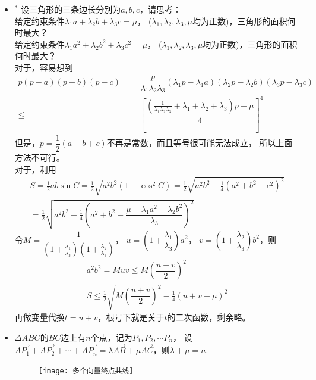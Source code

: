 \begin{itemize}[leftmargin=\inteval{\myitemleftmargin}pt,itemsep=
   \inteval{\myitemitempsep}pt,topsep=\inteval{\myitemtopsep}pt]
\item $^*$ 设三角形的三条边长分别为$ a,b,c $，请思考：\\
 给定约束条件$ \lambda_1 a+\lambda_2 b+\lambda_3 c=\mu $，
($ \lambda_1,\lambda_2,\lambda_3,\mu $均为正数)，三角形的面积何时最大？\\
 给定约束条件$ \lambda_1 a^2+\lambda_2 b^2+\lambda_3 c^2=\mu $，
($ \lambda_1,\lambda_2,\lambda_3,\mu $均为正数)，三角形的面积何时最大？\\
对于，容易想到
\begin{align*}
    p(p-a)(p-b)(p-c)=&\ \dfrac{p}{\lambda_1 \lambda_2 \lambda_3}
    (\lambda_1 p-\lambda_1 a)(\lambda_2 p-\lambda_2 b)
    (\lambda_3 p-\lambda_3 c)\\ \leq&\ 
    \left[\dfrac{\left(\frac{1}{\lambda_1
            \lambda_2 \lambda_3}+\lambda_1+\lambda_2+
        \lambda_3\right)p-\mu}{4}\right]^4
\end{align*}
但是，$ p=\dfrac{1}{2}(a+b+c) $不再是常数，而且等号很可能无法成立，
所以上面方法不可行。\\
对于，利用
\begin{gather*}
    S=\frac{1}{2}ab\sin C=\frac{1}{2}\sqrt{a^2b^2(1-\cos^2 C)}=
    \frac{1}{2}\sqrt{a^2b^2-\frac{1}{4}(a^2+b^2-c^2)^2}  \\
    = \frac{1}{2}\sqrt{a^2b^2-\frac{1}{4}\left(a^2+b^2-
        \dfrac{\mu-\lambda_1 a^2-\lambda_2b^2}{\lambda_3}\right)^2}
\end{gather*}
令$ M=\dfrac{1}{\left(1+\frac{\lambda_1}{\lambda_3}\right)
    \left(1+\frac{\lambda_2}{\lambda_3}\right)} $，
$ u=\left(1+\dfrac{\lambda_1}{\lambda_3}\right)a^2 $，
$ v=\left(1+\dfrac{\lambda_2}{\lambda_3}\right)b^2 $，则
\begin{gather*}
    a^2b^2=Muv \leq M\left(\dfrac{u+v}{2}\right)^2 \\
    S\leq \frac{1}{2}\sqrt{M\left(\dfrac{u+v}{2}\right)^2
        -\frac{1}{4}\left(u+v-\mu \right)^2} 
\end{gather*}
再做变量代换$ t=u+v $，根号下就是关于$ t $的二次函数，剩余略。

\item $ \Delta ABC $的$ BC $边上有$ n $个点，记为$ P_1,P_2,\cdots P_n $，
设$ \vec{AP_1}+\vec{AP_2}+\cdots +\vec{AP_n}=
\lambda \vec{AB} +\mu \vec{AC} $，则$ \lambda+\mu=n $. \begin{figure}[h]
    \centering
    \texttt{[image: 多个向量终点共线]}
\end{figure}

\end{itemize}

